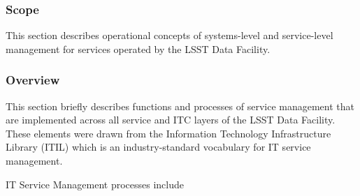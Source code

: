 
\subsubsection{Scope}
This section describes operational concepts of systems-level and service-level
management for services operated by the LSST Data Facility.

\subsubsection{Overview}
This section briefly describes functions and processes of service
management that are implemented across all service and ITC layers of
the LSST Data Facility. These elements were drawn from the Information
Technology Infrastructure Library (ITIL) which is an industry-standard
vocabulary for IT service management.

IT Service Management processes include

